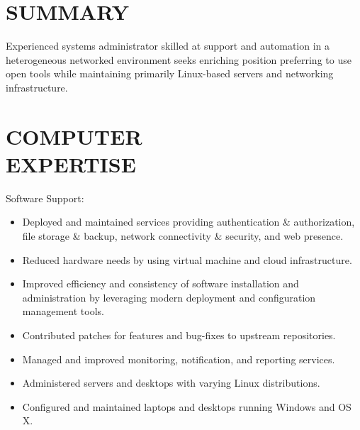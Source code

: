 \documentclass[line,margin]{res}
\begin{document}

\address{3301 Elliot Ave S. Apt 1, Minneapolis, MN 55407}
\address{deisum@gmail.com 612.205.9789}
 
\begin{resume}
 
\section{SUMMARY}
    Experienced systems administrator skilled at support and automation in
    a heterogeneous networked environment seeks enriching position
    preferring to use open tools while maintaining primarily Linux-based
    servers and networking infrastructure. 
 

\section{COMPUTER \\ EXPERTISE}
    Software Support:
    \vspace{1 mm}
    \begin{itemize} \itemsep -1.5pt %
        \item Deployed and maintained services providing authentication
        \& authorization, file storage \& backup, network connectivity \&
        security, and web presence.
        \item Reduced hardware needs by using virtual machine and cloud
        infrastructure.
        \item Improved efficiency and consistency of software installation
        and administration by leveraging modern deployment and
        configuration management tools.
        \item Contributed patches for features and bug-fixes to upstream
        repositories.
        \item Managed and improved monitoring, notification, and reporting
        services.
        \item Administered servers and desktops with varying Linux
        distributions.
        \item Configured and maintained laptops and desktops
        running Windows and OS X.
    \end{itemize}
    \vspace{-3 mm}


\end{resume}
\end{document}
